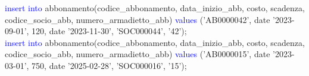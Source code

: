 \documentclass{article}
\begin{document}
\begin{flushleft}
{        \hspace*{0.5em}\textcolor{blue}{insert into} abbonamento(codice\_abbonamento, data\_inizio\_abb, costo, scadenza, \hspace*{0.5em}codice\_socio\_abb, numero\_armadietto\_abb) \textcolor{blue}{values} ('AB0000042', date '2023-09-01', \hspace*{0.5em}120, date '2023-11-30', 'SOC000044', '42'); \\
        \vspace{2mm}
        \hspace*{0.5em}\textcolor{blue}{insert into} abbonamento(codice\_abbonamento, data\_inizio\_abb, costo, scadenza, \hspace*{0.5em}codice\_socio\_abb, numero\_armadietto\_abb) \textcolor{blue}{values} ('AB0000015', date '2023-03-01', \hspace*{0.5em}750, date '2025-02-28', 'SOC000016', '15'); \\}
    \end{flushleft}
\end{document}
